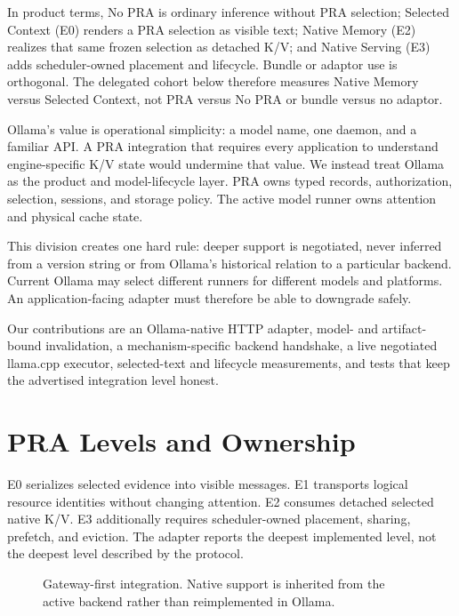 \documentclass[10pt]{article}
\begin{document}
In product terms, No PRA is ordinary inference without PRA selection; Selected
Context (E0) renders a PRA selection as visible text; Native Memory (E2)
realizes that same frozen selection as detached K/V; and Native Serving (E3)
adds scheduler-owned placement and lifecycle. Bundle or adaptor use is
orthogonal. The delegated cohort below therefore measures Native Memory versus
Selected Context, not PRA versus No PRA or bundle versus no adaptor.

Ollama's value is operational simplicity: a model name, one daemon, and a
familiar API. A PRA integration that requires every application to understand
engine-specific K/V state would undermine that value. We instead treat Ollama
as the product and model-lifecycle layer. PRA owns typed records,
authorization, selection, sessions, and storage policy. The active model runner
owns attention and physical cache state.

This division creates one hard rule: deeper support is negotiated, never
inferred from a version string or from Ollama's historical relation to a
particular backend. Current Ollama may select different runners for different
models and platforms. An application-facing adapter must therefore be able to
downgrade safely.

Our contributions are an Ollama-native HTTP adapter, model- and artifact-bound
invalidation, a mechanism-specific backend handshake, a live negotiated
llama.cpp executor, selected-text and lifecycle measurements, and tests that
keep the advertised integration level honest.

\section{PRA Levels and Ownership}
E0 serializes selected evidence into visible messages. E1 transports logical
resource identities without changing attention. E2 consumes detached selected
native K/V. E3 additionally requires scheduler-owned placement, sharing,
prefetch, and eviction. The adapter reports the deepest implemented level, not
the deepest level described by the protocol.

\begin{figure}[t]
\centering
{}
\caption{Gateway-first integration. Native support is inherited from the active
backend rather than reimplemented in Ollama.}
\label{fig:architecture}
\end{figure}
\end{document}

